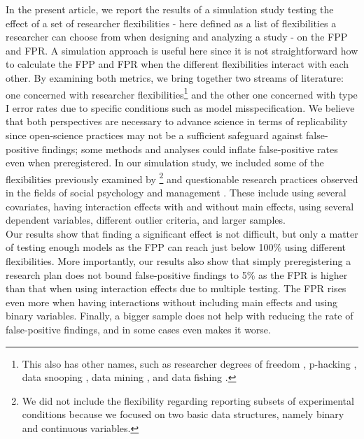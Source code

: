 In the present article, we report the results of a simulation study testing the effect of a set of researcher flexibilities - here defined as a list of flexibilities a researcher can choose from when designing and analyzing a study - on the FPP and FPR. A simulation approach is useful here since it is not straightforward how to calculate the FPP and FPR when the different flexibilities interact with each other. By examining both metrics, we bring together two streams of literature: one concerned with researcher flexibilities\footnote{This also has other names, such as researcher degrees of freedom \citep{Simmons2011}, p-hacking \citep{simonsohn2014p}, data snooping \citep{white2000reality}, data mining \citep{lovell1983}, and data fishing \citep{selvin1966data}.} and the other one concerned with type I error rates due to specific conditions such as model misspecification. We believe that both perspectives are necessary to advance science in terms of replicability since open-science practices may not be a sufficient safeguard against false-positive findings; some methods and analyses could inflate false-positive rates even when preregistered. In our simulation study, we included some of the flexibilities previously examined by \cite{Simmons2011}\footnote{We did not include the flexibility regarding reporting subsets of experimental conditions because we focused on two basic data structures, namely binary and continuous variables.} and questionable research practices observed in the fields of social psychology \citep{Cairo2020} and management \citep{OBoyle2017}. These include using several covariates, having interaction effects with and without main effects, using several dependent variables, different outlier criteria, and larger samples. \\ 
Our results show that finding a significant effect is not difficult, but only a matter of testing enough models as the FPP can reach just below 100\% using different flexibilities. More importantly, our results also show that simply preregistering a research plan does not bound false-positive findings to 5\% as the FPR is higher than that when using interaction effects due to multiple testing. The FPR rises even more when having interactions without including main effects and using binary variables. Finally, a bigger sample does not help with reducing the rate of false-positive findings, and in some cases even makes it worse. 
